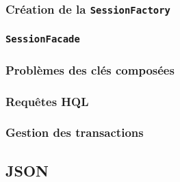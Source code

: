 
\cprotect\subsubsection{Création de la \verb|SessionFactory|}


\cprotect\subsubsection{\verb|SessionFacade|}


\subsubsection{Problèmes des clés composées}


\subsubsection{Requêtes HQL}

\subsubsection{Gestion des transactions}


\subsection{JSON}

